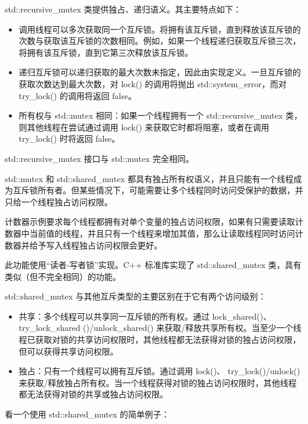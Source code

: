std::recursive\_mutex 类提供独占、递归语义。其主要特点如下：

\begin{itemize}
\item
调用线程可以多次获取同一个互斥锁。将拥有该互斥锁，直到释放该互斥锁的次数与获取该互斥锁的次数相同。例如，如果一个线程递归获取互斥锁三次，将拥有该互斥锁，直到它第三次释放该互斥锁。

\item
递归互斥锁可以递归获取的最大次数未指定，因此由实现定义。一旦互斥锁的获取次数达到最大次数，对 lock() 的调用将抛出 std::system\_error，而对 try\_lock() 的调用将返回 false。

\item
所有权与 std::mutex 相同：如果一个线程拥有一个 std::recursive\_mutex 类，则其他线程在尝试通过调用 lock() 来获取它时都将阻塞，或者在调用 try\_lock() 时将返回 false。
\end{itemize}

std::recursive\_mutex 接口与 std::mutex 完全相同。


std::mutex 和 std::shared\_mutex 都具有独占所有权语义，并且只能有一个线程成为互斥锁所有者。但某些情况下，可能需要让多个线程同时访问受保护的数据，并只给一个线程独占访问权限。

计数器示例要求每个线程都拥有对单个变量的独占访问权限，如果有只需要读取计数器中当前值的线程，并且只有一个线程来增加其值，那么让读取线程同时访问计数器并给予写入线程独占访问权限会更好。

此功能使用“读者-写者锁”实现。C++ 标准库实现了 std::shared\_mutex 类，具有类似（但不完全相同）的功能。

std::shared\_mutex 与其他互斥类型的主要区别在于它有两个访问级别：

\begin{itemize}
\item
共享：多个线程可以共享同一互斥锁的所有权。通过 lock\_shared()、 try\_lock\_shared ()/unlock\_shared() 来获取/释放共享所有权。当至少一个线程已获取对锁的共享访问权限时，其他线程都无法获得对锁的独占访问权限，但可以获得共享访问权限。

\item
独占：只有一个线程可以拥有互斥锁。通过调用 lock()、 try\_lock()/unlock() 来获取/释放独占所有权。当一个线程获得对锁的独占访问权限时，其他线程都无法获得对锁的共享或独占访问权限。
\end{itemize}

看一个使用 std::shared\_mutex 的简单例子：

